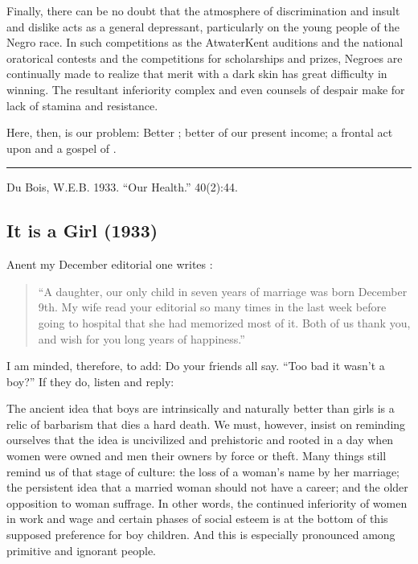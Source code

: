 \documentclass[letterpaper,10pt,english]{jupyterBook}
\begin{document}
\sphinxAtStartPar
Finally, there can be no doubt that the atmosphere of discrimination and insult and dislike acts as a general depressant, particularly on the young people of the Negro race. In such competitions as the Atwater\sphinxhyphen{}Kent auditions and the national oratorical contests and the competitions for scholarships and prizes, Negroes are continually made to realize that merit with a dark skin has great difficulty in winning. The resultant inferiority complex and even counsels of despair make for lack of stamina and resistance.

\sphinxAtStartPar
Here, then, is our problem: Better ; better  of our present income; a frontal act upon  and a gospel of .


\bigskip\hrule\bigskip


\sphinxAtStartPar
{} Du Bois, W.E.B. 1933. “Our Health.”  40(2):44.


\subsection{It is a Girl (1933)}
\label{\detokenize{Volumes/40/02/its_a_girl:it-is-a-girl-1933}}\label{\detokenize{Volumes/40/02/its_a_girl::doc}}
\sphinxAtStartPar
Anent my December editorial one writes :
\begin{quote}

\sphinxAtStartPar
“A daughter, our only child in seven years of marriage was born December 9th. My wife read your editorial so many times in the last week before going to hospital that she had memorized most of it. Both of us thank you, and wish for you long years of happiness.”
\end{quote}

\sphinxAtStartPar
I am minded, therefore, to add: Do your friends all say. “Too bad it wasn’t a boy?” If they do, listen and reply:

\sphinxAtStartPar
The ancient idea that boys are intrinsically and naturally better than girls is a relic of barbarism that dies a hard death. We must, however, insist on reminding ourselves that the idea is uncivilized and pre\sphinxhyphen{}historic and rooted in a day when women were owned and men their owners by force or theft. Many things still remind us of that stage of culture: the loss of a woman’s name by her marriage; the persistent idea that a married woman should not have a career; and the older opposition to woman suffrage. In other words, the continued inferiority of women in work and wage and certain phases of social esteem is at the bottom of this supposed preference for boy children. And this is especially pronounced among primitive and ignorant people.
\end{document}
